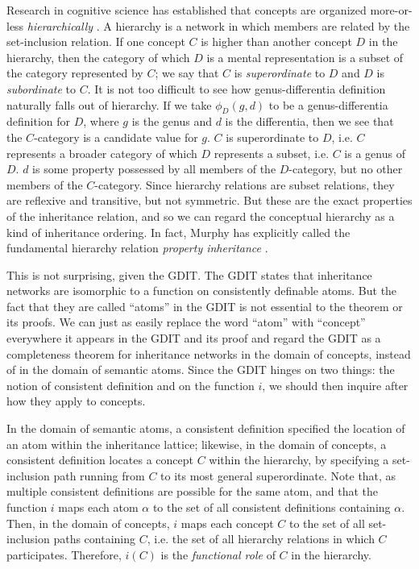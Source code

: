 \documentclass[12pt]{amsart}
\begin{document}
Research in cognitive science has established that concepts are organized more-or-less \emph{hierarchically} \cite{inhelder_early_1964} \cite{collins_retrieval_1975} \cite{berlin_ethnobiological_1992}. A hierarchy is a network in which members are related by the set-inclusion relation. If one concept $C$ is higher than another concept $D$ in the hierarchy, then the category of which $D$ is a mental representation is a subset of the category represented by $C$; we say that $C$ is \emph{superordinate} to $D$ and $D$ is \emph{subordinate} to $C$. It is not too difficult to see how genus-differentia definition naturally falls out of hierarchy. If we take $\phi_D(g,d)$ to be a genus-differentia definition for $D$, where $g$ is the genus and $d$ is the differentia, then we see that the $C$-category is a candidate value for $g$. $C$ is superordinate to $D$, i.e. $C$ represents a broader category of which $D$ represents a subset, i.e. $C$ is a genus of $D$. $d$ is some property possessed by all members of the $D$-category, but no other members of the $C$-category. Since hierarchy relations are subset relations, they are reflexive and transitive, but not symmetric. But these are the exact properties of the inheritance relation, and so we can regard the conceptual hierarchy as a kind of inheritance ordering. In fact, Murphy has explicitly called the fundamental hierarchy relation \emph{property inheritance} \cite{murphy_big_2002}.

This is not surprising, given the GDIT. The GDIT states that inheritance networks are isomorphic to a function on consistently definable atoms. But the fact that they are called ``atoms'' in the GDIT is not essential to the theorem or its proofs. We can just as easily replace the word ``atom'' with ``concept'' everywhere it appears in the GDIT and its proof and regard the GDIT as a completeness theorem for inheritance networks in the domain of concepts, instead of in the domain of semantic atoms. Since the GDIT hinges on two things: the notion of consistent definition and on the function $i$, we should then inquire after how they apply to concepts.

In the domain of semantic atoms, a consistent definition specified the location of an atom within the inheritance lattice; likewise, in the domain of concepts, a consistent definition locates a concept $C$ within the hierarchy, by specifying a set-inclusion path running from $C$ to its most general superordinate. Note that, as multiple consistent definitions are possible for the same atom, and that the function $i$ maps each atom $\alpha$ to the set of all consistent definitions containing $\alpha$. Then, in the domain of concepts, $i$ maps each concept $C$ to the set of all set-inclusion paths containing $C$, i.e. the set of all hierarchy relations in which $C$ participates. Therefore, $i(C)$ is the \emph{functional role} of $C$ in the hierarchy.
\end{document}
